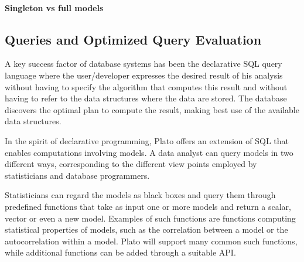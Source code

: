 \paragraph{Singleton vs full models} 



\subsection{Queries and Optimized Query Evaluation}
\label{sec:queries}
A key success factor of database systems has been the declarative SQL query language where the user/developer expresses the desired result of his analysis without having to specify the algorithm that computes this result and without having to refer to the data structures where the data are stored. The database discovers the optimal plan to compute the result, making best use of the available data structures. 

In the spirit of declarative programming, Plato offers an extension of SQL that enables computations involving models. A data analyst can query models in two different ways, corresponding to the different view points employed by statisticians and database programmers.

Statisticians can regard the models as black boxes and query them through predefined functions that take as input one or more models and return a scalar, vector or even a new model. Examples of such functions are functions computing statistical properties of models, such as the correlation between a model or the autocorrelation within a model. Plato will support many common such functions, while additional functions can be added through a suitable API.

